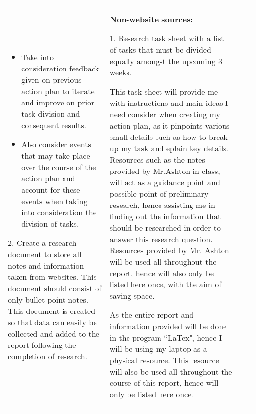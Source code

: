 \documentclass[11pt, a4paper]{article}
\begin{document}
\begin{landscape}
\begin{longtable}{|m{2.5cm}|m{6.6cm}|m{6.6cm}|m{9.41cm}|}
				\begin{itemize}
					\item Take into consideration feedback given on previous action plan to iterate and improve on prior task division and consequent results.	
					\item Also consider events that may take place over the course of the action plan and account for these events when taking into consideration the division of tasks.
				\end{itemize}
			
				2. Create a research document to store all notes and information taken from websites. This document should consist of only bullet point notes. This document is created so that data can easily be collected and added to the report following the completion of research.\newline

		
				&
			
				\underline{\textbf{Non-website sources:}}
				\newline
			
				1. Research task sheet with a list of tasks that must be divided equally amongst the upcoming 3 weeks.
				\newline
			
				This task sheet will provide me with instructions and main ideas I need consider when creating my  action plan, as it pinpoints various small details such as how to break up my task and eplain key details. Resources such as the notes provided by Mr.Ashton in class, will act as a guidance point and possible point of preliminary research, hence assisting me in finding out the information that should be researched in order to answer this research question. Resources provided by Mr. Ashton will be used all throughout the report, hence will also only be listed here once, with the aim of saving space.
				\newline
			
				As the entire report and information provided will be done in the program ``LaTex", hence I will be using my laptop as a physical resource. This resource will also be used all throughout the course of this report, hence will only be listed here once.
				
				&
				

\end{longtable}
\end{landscape}
\end{document}
